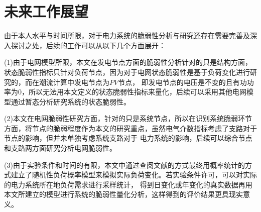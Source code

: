 \section{未来工作展望}
\label{sec:feature}
由于本人水平与时间所限，对于电力系统的脆弱性分析与研究还存在需要完善及深入探讨之处，后续的工作可以从以下几个方面展开：

(1)由于电网模型所限，本文在发电节点方面的脆弱性分析针对的只是结构方面，状态脆弱性指标只针对负荷节点，因为对于电网状态脆弱性是基于负荷变化进行研究的，而在潮流计算中发电节点为$PV$节点，
即发电节点的电压是不变的且有功功率为0，所以无法用本文定义的状态脆弱性指标来量化，后续可以采用其他电网模型通过暂态分析研究系统的状态脆弱性。

(2)本文在电网脆弱性研究方面，针对的只是系统节点，所以在识别系统脆弱环节方面，将节点的脆弱程度作为本文的研究重点，虽然电气介数指标考虑了支路对于节点的影响，但并未单独考虑系统支路对于
电力系统的影响，后续可以综合节点和支路两方面研究分析电网脆弱性。

(3)由于实验条件和时间的有限，本文中通过查阅文献的方式最终用概率统计的方式建立了随机性负荷概率模型来模拟实际负荷变化。若实验条件许可，可以对实际的电力系统所在地负荷需求进行采样统计，
得到日变化或年变化的真实数据再用本文所建立的模型进行系统的脆弱性量化分析，这样得到的评价结果更具现实意义。
